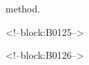 \documentclass[11pt,a4paper]{article}
\begin{document}
method.

<!--block:B0125-->



<!--block:B0126-->
\end{document}
